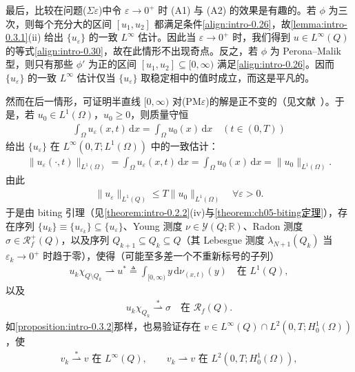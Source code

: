 \documentclass[../main.tex]{subfiles}
\begin{document}
最后，比较在问题($\Sigma\varepsilon$)中令 $\varepsilon\to0^+$ 时 (A1) 与 (A2) 的效果是有趣的。若 $\phi$ 为三次，则每个充分大的区间 $[u_1,u_2]$ 都满足条件\eqref{align:intro-0.26}，故\cref{lemma:intro-0.3.1}(ii) 给出 $\{u_\varepsilon\}$ 的一致 $L^\infty$ 估计。因此当 $\varepsilon\to0^+$ 时，我们得到 $u\in L^\infty(Q)$ 的等式\eqref{align:intro-0.30}，故在此情形不出现奇点。反之，若 $\phi$ 为 Perona--Malik 型，则只有那些 $\phi'$ 为正的区间 $[u_1,u_2]\subseteq[0,\infty)$ 满足\eqref{align:intro-0.26}。因而 $\{u_\varepsilon\}$ 的一致 $L^\infty$ 估计仅当 $\{u_\varepsilon\}$ 取稳定相中的值时成立，而这是平凡的。

然而在后一情形，可证明半直线 $[0,\infty)$ 对(PM$\varepsilon$)的解是正不变的（见文献~\cite{ref96}）。于是，若 $u_0\in L^1(\Omega)$，$u_0\geqslant0$，则质量守恒
\begin{align*}
\int_\Omega u_\varepsilon(x,t)\,\mathrm{d}x = \int_\Omega u_0(x)\,\mathrm{d}x \quad (t\in(0,T))
\end{align*}
给出 $\{u_\varepsilon\}$ 在 $L^\infty(0,T;L^1(\Omega))$ 中的一致估计：
\begin{align*}
\|u_\varepsilon(\cdot,t)\|_{L^1(\Omega)}
= \int_\Omega u_\varepsilon(x,t)\,\mathrm{d}x
= \int_\Omega u_0(x)\,\mathrm{d}x
= \|u_0\|_{L^1(\Omega)}.
\end{align*}
由此
\begin{align*}
\|u_\varepsilon\|_{L^1(Q)} \leqslant T\|u_0\|_{L^1(\Omega)} \quad \forall\varepsilon>0.
\end{align*}
于是由 biting 引理（见\cref{theorem:intro-0.2.2}(iv)与\cref{theorem:ch05-biting定理}），存在序列 $\{u_k\}\equiv\{u_{\varepsilon_k}\}\subseteq\{u_\varepsilon\}$、Young 测度 $\nu\in\mathcal{Y}(Q;\mathbb{R})$、Radon 测度 $\sigma\in\mathscr{R}^+_f(Q)$，以及序列 $Q_{k+1}\subseteq Q_k\subseteq Q$（其 Lebesgue 测度 $\lambda_{N+1}(Q_k)$ 当 $\varepsilon_k\to0^+$ 时趋于零），使得（可能至多差一个不重新标号的子列）
\begin{align*}
u_k\chi_{Q\setminus Q_k}\rightharpoonup u^* \triangleq  \int_{[0,\infty)}y\,\mathrm{d}\nu_{(x,t)}(y)
\quad \text{在 }L^1(Q),
\end{align*}
以及
\begin{align}
u_k\chi_{Q_k} \stackrel{*}{\rightharpoonup}\sigma \quad \text{在 }\mathscr{R}_f(Q). \label{align:intro-0.33}
\end{align}
如\cref{proposition:intro-0.3.2}那样，也易验证存在 $v\in L^\infty(Q)\cap L^2(0,T;H^1_0(\Omega))$，使
\begin{align*}
v_k\stackrel{*}{\rightharpoonup}v \text{ 在 }L^\infty(Q),
\qquad
v_k\rightharpoonup v \text{ 在 }L^2(0,T;H^1_0(\Omega)),
\end{align*}
\end{document}

